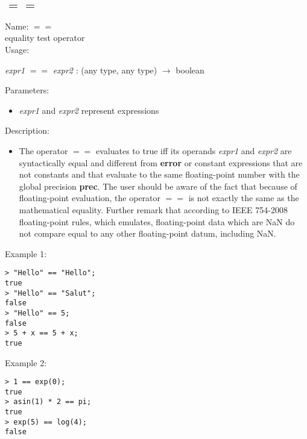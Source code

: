 \subsection{$==$}
\label{labequal}
\noindent Name: \textbf{$==$}\\
equality test operator\\
\noindent Usage: 
\begin{center}
\emph{expr1} \textbf{$==$} \emph{expr2} : (\textsf{any type}, \textsf{any type}) $\rightarrow$ \textsf{boolean}\\
\end{center}
Parameters: 
\begin{itemize}
\item \emph{expr1} and \emph{expr2} represent expressions
\end{itemize}
\noindent Description: \begin{itemize}

\item The operator \textbf{$==$} evaluates to true iff its operands \emph{expr1} and
   \emph{expr2} are syntactically equal and different from \textbf{error} or constant
   expressions that are not constants and that evaluate to the same
   floating-point number with the global precision \textbf{prec}. The user should
   be aware of the fact that because of floating-point evaluation, the
   operator \textbf{$==$} is not exactly the same as the mathematical
   equality. Further remark that according to IEEE 754-2008 floating-point
   rules, which \sollya emulates, floating-point data which are NaN do not
   compare equal to any other floating-point datum, including NaN. 
\end{itemize}
\noindent Example 1: 
\begin{center}\begin{minipage}{15cm}\begin{Verbatim}[frame=single]
> "Hello" == "Hello";
true
> "Hello" == "Salut";
false
> "Hello" == 5;
false
> 5 + x == 5 + x;
true
\end{Verbatim}
\end{minipage}\end{center}
\noindent Example 2: 
\begin{center}\begin{minipage}{15cm}\begin{Verbatim}[frame=single]
> 1 == exp(0);
true
> asin(1) * 2 == pi;
true
> exp(5) == log(4);
false
\end{Verbatim}
\end{minipage}\end{center}
